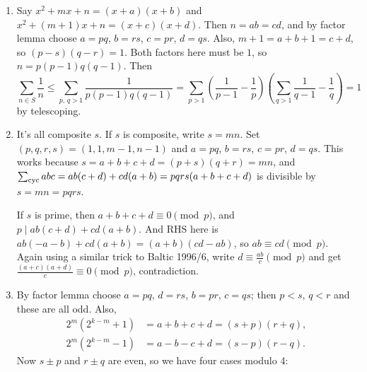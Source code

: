 \documentclass[11pt,paper=letter]{scrartcl}
\begin{document}
\begin{enumerate}
\item Say $x^2 + mx + n = (x + a)(x + b)$ and $x^2 + (m + 1)x + n = (x + c)(x + d)$. Then $n = ab = cd$, and by factor lemma choose $a = pq$, $b = rs$, $c = pr$, $d = qs$. Also, $m + 1 = a + b + 1 = c + d$, so $(p - s)(q - r) = 1$. Both factors here must be $1$, so $n = p(p - 1)q(q - 1)$. Then \[
  \sum_{n \in S} \frac{1}{n} \le \sum_{p,\,q > 1} \frac{1}{p(p-1)q(q-1)} = \sum_{p > 1} \left( \frac{1}{p - 1} - \frac{1}{p}\right) \left( \sum_{q > 1} \frac{1}{q - 1} - \frac{1}{q} \right) = 1
\]
by telescoping.

\item It's all composite $s$. If $s$ is composite, write $s = mn$. Set $(p, q, r, s) = (1, 1, m - 1, n - 1)$ and $a = pq$, $b = rs$, $c = pr$, $d = qs$. This works because $s = a + b + c + d = (p + s)(q + r) = mn$, and $\sum_{\mathrm{cyc}} abc = ab(c + d) + cd(a + b) = pqrs(a + b + c + d)$ is divisible by $s = mn = pqrs$.

If $s$ is prime, then $a + b + c + d \equiv 0 \pmod p$, and $p \mid ab(c + d) + cd(a + b)$. And RHS here is $ab(- a - b) + cd(a + b) = (a + b)(cd - ab)$, so $ab \equiv cd \pmod p$. Again using a similar trick to Baltic 1996/6, write $d \equiv \frac{ab}{c} \pmod p$ and get $ \frac{(a + c)(a + d)}{c} \equiv 0 \pmod p $, contradiction.

\item By factor lemma choose $a = pq$, $d = rs$, $b = pr$, $c = qs$; then $p < s$, $q < r$ and these are all odd. Also,
\begin{align*}
  2^m ( 2^{k - m} + 1 ) &= a + b + c + d = (s + p)(r + q), \\
  2^m ( 2^{k - m} - 1 ) &= a - b - c + d = (s - p)(r - q).
\end{align*}
Now $s \pm p$ and $r \pm q$ are even, so we have four cases modulo 4:


\end{enumerate}
\end{document}
